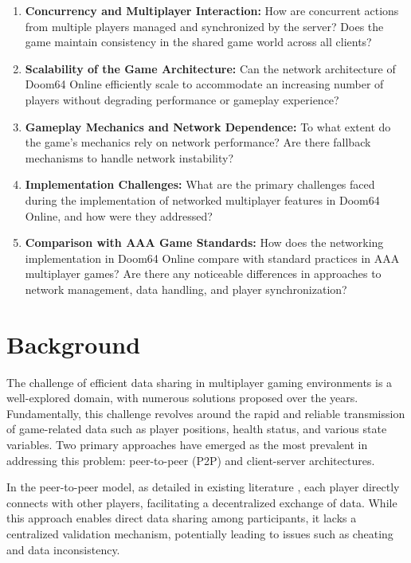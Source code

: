 \begin{enumerate}
    
    \item \textbf{Concurrency and Multiplayer Interaction:} How are concurrent actions from multiple players managed and synchronized by the server? Does the game maintain consistency in the shared game world across all clients?
    
    \item \textbf{Scalability of the Game Architecture:} Can the network architecture of Doom64 Online efficiently scale to accommodate an increasing number of players without degrading performance or gameplay experience?
    
    \item \textbf{Gameplay Mechanics and Network Dependence:} To what extent do the game's mechanics rely on network performance? Are there fallback mechanisms to handle network instability?
    
    \item \textbf{Implementation Challenges:} What are the primary challenges faced during the implementation of networked multiplayer features in Doom64 Online, and how were they addressed?
    
    \item \textbf{Comparison with AAA Game Standards:} How does the networking implementation in Doom64 Online compare with standard practices in AAA multiplayer games? Are there any noticeable differences in approaches to network management, data handling, and player synchronization?
    
\end{enumerate}
\section{Background}
\label{chap:background}


The challenge of efficient data sharing in multiplayer gaming environments is a well-explored domain, with numerous solutions proposed over the years. Fundamentally, this challenge revolves around the rapid and reliable transmission of game-related data such as player positions, health status, and various state variables. Two primary approaches have emerged as the most prevalent in addressing this problem: peer-to-peer (P2P) and client-server architectures.

In the peer-to-peer model, as detailed in existing literature \cite{peertopeer}, each player directly connects with other players, facilitating a decentralized exchange of data. While this approach enables direct data sharing among participants, it lacks a centralized validation mechanism, potentially leading to issues such as cheating and data inconsistency.

